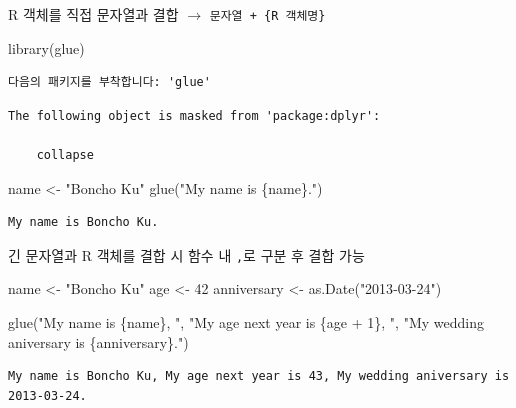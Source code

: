 \documentclass[
  11pt,
]{krantz}
\newenvironment{Shaded}{\begin{snugshade}}{\end{snugshade}}
\newcommand{\DecValTok}[1]{\textcolor[rgb]{0.06,0.06,0.06}{#1}}
\newcommand{\FunctionTok}[1]{\textcolor[rgb]{0,0,0}{#1}}
\newcommand{\NormalTok}[1]{#1}
\newcommand{\OtherTok}[1]{\textcolor[rgb]{0.37,0.37,0.37}{#1}}
\newcommand{\StringTok}[1]{\textcolor[rgb]{0.5,0.5,0.5}{#1}}
\begin{document}
R 객체를 직접 문자열과 결합 \(\rightarrow\) \texttt{문자열\ +\ \{R\ 객체명\}}

\footnotesize

\begin{Shaded}
\begin{Highlighting}[]
\FunctionTok{library}\NormalTok{(glue)}
\end{Highlighting}
\end{Shaded}

\begin{verbatim}
다음의 패키지를 부착합니다: 'glue'
\end{verbatim}

\begin{verbatim}
The following object is masked from 'package:dplyr':

    collapse
\end{verbatim}

\begin{Shaded}
\begin{Highlighting}[]
\NormalTok{name }\OtherTok{\textless{}{-}} \StringTok{"Boncho Ku"}
\FunctionTok{glue}\NormalTok{(}\StringTok{"My name is \{name\}."}\NormalTok{)}
\end{Highlighting}
\end{Shaded}

\begin{verbatim}
My name is Boncho Ku.
\end{verbatim}

\normalsize

긴 문자열과 R 객체를 결합 시 함수 내 \texttt{,}로 구분 후 결합 가능

\footnotesize

\begin{Shaded}
\begin{Highlighting}[]
\NormalTok{name }\OtherTok{\textless{}{-}} \StringTok{"Boncho Ku"}
\NormalTok{age }\OtherTok{\textless{}{-}} \DecValTok{42}
\NormalTok{anniversary }\OtherTok{\textless{}{-}} \FunctionTok{as.Date}\NormalTok{(}\StringTok{"2013{-}03{-}24"}\NormalTok{)}

\FunctionTok{glue}\NormalTok{(}\StringTok{"My name is \{name\}, "}\NormalTok{, }
     \StringTok{"My age next year is \{age + 1\}, "}\NormalTok{, }
     \StringTok{"My wedding aniversary is \{anniversary\}."}\NormalTok{)}
\end{Highlighting}
\end{Shaded}

\begin{verbatim}
My name is Boncho Ku, My age next year is 43, My wedding aniversary is 2013-03-24.
\end{verbatim}
\end{document}
